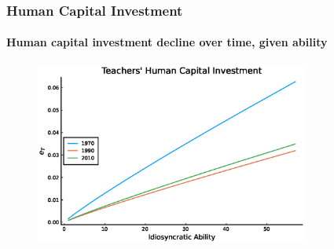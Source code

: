\documentclass[11pt]{beamer}
\begin{document}
\begin{frame}
\frametitle{Human Capital Investment}
\framesubtitle{Human capital investment decline over time, given ability}
\begin{figure}
 		\begin{center}
 			\includegraphics[width=0.8\textwidth]{plots/eT_steadystate.eps}
 			\label{ }
 		\end{center}
 	\end{figure}
\end{frame}


    

\end{document}
